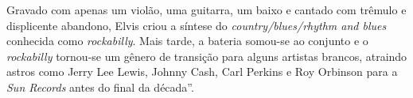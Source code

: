 Gravado com apenas um violão, uma guitarra, um baixo e cantado com trêmulo e displicente abandono, 
Elvis criou a síntese do {\it country/blues/rhythm and blues} conhecida como {\it rockabilly}. Mais tarde, 
a 
bateria 
somou-se 
ao conjunto e o {\it rockabilly} tornou-se um gênero de transição para alguns artistas brancos, atraindo 
astros como Jerry Lee Lewis, Johnny Cash, Carl Perkins e Roy Orbinson para a {\it Sun Records} antes do 
final da década”.
% 
% 
% 
% 
% 

